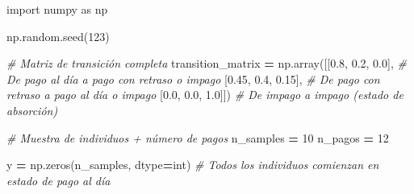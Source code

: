 \documentclass[
  a4paper,
  DIV=11,
  numbers=noendperiod]{scrreprt}
\newenvironment{Shaded}{\begin{snugshade}}{\end{snugshade}}
\newcommand{\BuiltInTok}[1]{#1}
\newcommand{\CommentTok}[1]{\textcolor[rgb]{0.56,0.35,0.01}{\textit{#1}}}
\newcommand{\DecValTok}[1]{\textcolor[rgb]{0.00,0.00,0.81}{#1}}
\newcommand{\FloatTok}[1]{\textcolor[rgb]{0.00,0.00,0.81}{#1}}
\newcommand{\ImportTok}[1]{#1}
\newcommand{\NormalTok}[1]{#1}
\newcommand{\OperatorTok}[1]{\textcolor[rgb]{0.81,0.36,0.00}{\textbf{#1}}}
\begin{document}
\begin{Shaded}
\begin{Highlighting}[numbers=left,,]
\ImportTok{import}\NormalTok{ numpy }\ImportTok{as}\NormalTok{ np}

\NormalTok{np.random.seed(}\DecValTok{123}\NormalTok{)}

\CommentTok{\# Matriz de transición completa}
\NormalTok{transition\_matrix }\OperatorTok{=}\NormalTok{ np.array([[}\FloatTok{0.8}\NormalTok{, }\FloatTok{0.2}\NormalTok{, }\FloatTok{0.0}\NormalTok{],  }\CommentTok{\# De pago al día a pago con retraso o impago}
\NormalTok{                              [}\FloatTok{0.45}\NormalTok{, }\FloatTok{0.4}\NormalTok{, }\FloatTok{0.15}\NormalTok{],  }\CommentTok{\# De pago con retraso a pago al día o impago}
\NormalTok{                              [}\FloatTok{0.0}\NormalTok{, }\FloatTok{0.0}\NormalTok{, }\FloatTok{1.0}\NormalTok{]]) }\CommentTok{\# De impago a impago (estado de absorción)}

\CommentTok{\# Muestra de individuos + número de pagos}
\NormalTok{n\_samples }\OperatorTok{=} \DecValTok{10}
\NormalTok{n\_pagos }\OperatorTok{=} \DecValTok{12}

\NormalTok{y }\OperatorTok{=}\NormalTok{ np.zeros(n\_samples, dtype}\OperatorTok{=}\BuiltInTok{int}\NormalTok{)  }\CommentTok{\# Todos los individuos comienzan en estado de pago al día}


\end{Highlighting}
\end{Shaded}
\end{document}
